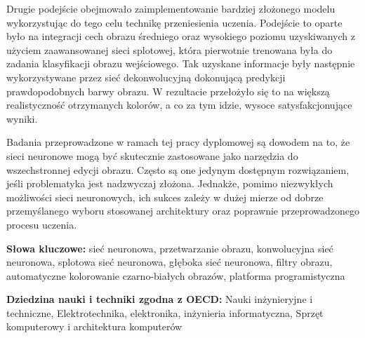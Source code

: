   Drugie podejście obejmowało zaimplementowanie bardziej złożonego modelu
  wykorzystując do tego celu technikę przeniesienia uczenia. Podejście to oparte
  było na integracji cech obrazu średniego oraz wysokiego poziomu
  uzyskiwanych z użyciem
  zaawansowanej sieci splotowej, która pierwotnie trenowana była do zadania
  klasyfikacji obrazu wejściowego.
  Tak uzyskane informacje były następnie wykorzystywane przez sieć
  dekonwolucyjną dokonującą predykcji prawdopodobnych barwy obrazu.
  W rezultacie przełożyło się to na większą realistyczność otrzymanych kolorów,
  a co za tym idzie, wysoce satysfakcjonujące wyniki.

  Badania przeprowadzone w ramach tej pracy dyplomowej są dowodem na to, że
  sieci neuronowe mogą być skutecznie zastosowane jako narzędzia do wszechstronnej
  edycji obrazu. Często są one jedynym dostępnym rozwiązaniem, jeśli problematyka
  jest nadzwyczaj złożona. Jednakże, pomimo niezwykłych możliwości sieci
  neuronowych, ich sukces zależy w dużej mierze od dobrze przemyślanego
  wyboru stosowanej architektury oraz poprawnie przeprowadzonego
  procesu uczenia.

  \bigskip

  \noindent\textbf{Słowa kluczowe:} sieć neuronowa, przetwarzanie obrazu,
  konwolucyjna sieć neuronowa, splotowa sieć neuronowa,
  głęboka sieć neuronowa, filtry obrazu, automatyczne kolorowanie czarno-białych
  obrazów, platforma programistyczna

  \bigskip

  \noindent\textbf{Dziedzina nauki i techniki zgodna z OECD:} Nauki
  inżynieryjne i techniczne, Elektrotechnika, elektronika, inżynieria
  informatyczna, Sprzęt komputerowy i architektura komputerów
